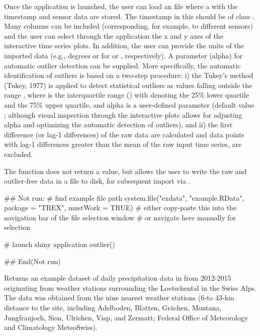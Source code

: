 \documentclass[a4paper]{book}
\begin{document}
\begin{Value}
Once the application is launched,
the user can load an  file where a 
with the timestamp and sensor data are stored.
The timestamp in this  should be of class .
Many columns can be included (corresponding, for example, to different sensors)
and the user can select through the application the x and y axes of the interactive time series plots.
In addition, the user can provide the units of the imported data
(e.g., degrees  or  for  or , respectively).
A parameter (alpha) for automatic outlier detection can be supplied.
More specifically, the automatic identification of outliers is based on a
two-step procedure:
i) the Tukey’s method (Tukey, 1977) is applied to detect statistical outliers
as values falling outside the range
,
where  is the interquartile range
()
with  denoting the 25\% lower quartile and  the
75\% upper quartile, and alpha is a user-defined parameter
(default value ;
although visual inspection through the interactive plots allows for adjusting
alpha and optimizing the automatic detection of outliers),
and ii) the first difference (or lag-1 differences) of the raw data are calculated
and data points with lag-1 differences greater
than the mean of the raw input time series, are excluded.

The function does not return a value, but allows the user
to write the raw and outlier-free data in a  file to disk, for
subsequent import via .
\end{Value}
%
\begin{Examples}
\begin{ExampleCode}
## Not run: 
# find example file path
system.file("exdata", "example.RData", package = "TREX", mustWork = TRUE)
# either copy-paste this into the navigation bar of the file selection window
# or navigate here manually for selection

# launch shiny application
outlier()


## End(Not run)

\end{ExampleCode}
\end{Examples}
%
\begin{Description}\relax
Returns an example dataset of daily precipitation data in 
from 2012-2015 originating from weather stations surrounding the Loetschental in the Swiss Alps.
The data was obtained from the nine nearest weather stations
(6‐to 43‐km distance to the site, including Adelboden, Blatten, Grächen, Montana, Jungfraujoch,
Sion, Ulrichen, Visp, and Zermatt; Federal Office of Meteorology and Climatology MeteoSwiss).
\end{Description}
\end{document}
